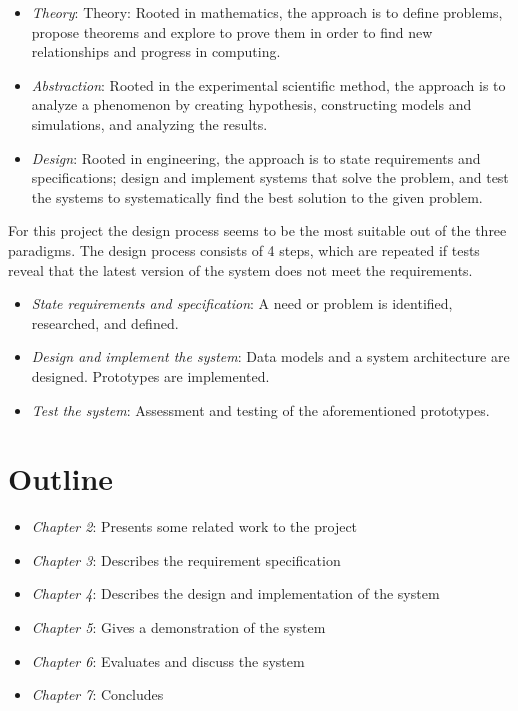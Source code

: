 \begin{itemize}
\item \emph{Theory}: 
Theory: Rooted in mathematics, the approach is to define problems, propose theorems and explore to prove them in order to find new relationships and progress in computing.
\item \emph{Abstraction}: 
Rooted in the experimental scientific method, the approach is to analyze a phenomenon by creating hypothesis, constructing models and simulations, and analyzing the results.
\item \emph{Design}: 
Rooted in engineering, the approach is to state requirements and specifications; design and implement systems that solve the problem, and test the systems to systematically find the best solution to the given problem.

\end{itemize}

For this project the design process seems to be the most suitable out of the three paradigms. The design process consists of 4 steps, which are repeated if tests reveal that the latest version of the system does not meet the requirements.

\begin{itemize}
\item \emph{State requirements and specification}: A need or problem is identified, researched, and defined.
\item \emph{Design and implement the system}: Data models and a system architecture are designed. Prototypes are implemented.
\item \emph{Test the system}: Assessment and testing of the aforementioned prototypes.
\end{itemize}

\section{Outline}

\begin{itemize}
\item \emph{Chapter 2}: Presents some related work to the project
\item \emph{Chapter 3}: Describes the requirement specification
\item \emph{Chapter 4}: Describes the design and implementation of the system
\item \emph{Chapter 5}: Gives a demonstration of the system
\item \emph{Chapter 6}: Evaluates and discuss the system
\item \emph{Chapter 7}: Concludes
\end{itemize}





